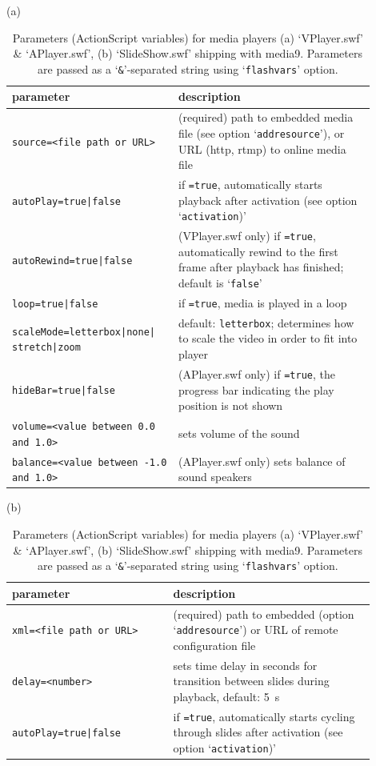 \documentclass[a4paper]{article}
\begin{document}
\begin{table}[tp]
\centering
\caption{Parameters (ActionScript variables) for media players (a) `VPlayer.swf' \& `APlayer.swf', (b) `SlideShow.swf' shipping with media9. Parameters are  passed as a `{\tt\&}'-separated string using `{\tt flashvars}' option.}\label{playerparams}
\vspace{3ex}
(a)\\ 
\begin{tabular}[c]{p{0.4\linewidth}p{0.5\linewidth}}\hline
parameter & description\\\hline\hline
{\tt source=<file path or URL>} & (required) path to embedded media file (see option `{\tt addresource}'), or URL (http, rtmp) to online media file\\
{\tt autoPlay=true|false} & if {\tt=true}, automatically starts playback after activation (see option `{\tt activation})'\\
{\tt autoRewind=true|false} &(VPlayer.swf only) if {\tt=true}, automatically rewind to the first frame after playback has finished; default is `{\tt false}'\\
{\tt loop=true|false} & if {\tt=true}, media is played in a loop\\
{\tt scaleMode=letterbox|none| \phantom{.}\hfill{}stretch|zoom} & default: {\tt letterbox}; determines how to scale the video in order to fit into player\\
{\tt hideBar=true|false} &(APlayer.swf only) if {\tt=true}, the progress bar indicating the play position is not shown\\
{\tt volume=<value between 0.0 \phantom{.}\hfill{}and 1.0>} & sets volume of the sound\\
{\tt balance=<value between \phantom{xxxx} \phantom{.}\hfill{}-1.0 and 1.0>} & (APlayer.swf only) sets balance of sound speakers\\\hline
\end{tabular}

\vspace{6ex}
(b)\\
\begin{tabular}[c]{p{0.4\linewidth}p{0.5\linewidth}}\hline
parameter & description\\\hline\hline
{\tt xml=<file path or URL>} & (required) path to embedded (option `{\tt addresource}') or URL of remote configuration file\\
{\tt delay=<number>} & sets time delay in seconds for transition between slides during playback, default: \SI{5}{\second}\\
{\tt autoPlay=true|false} & if {\tt=true}, automatically starts cycling through slides after activation (see option `{\tt activation})'\\\hline
\end{tabular}
\end{table}
\end{document}
